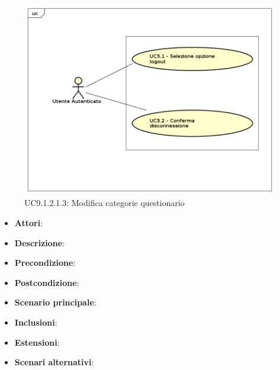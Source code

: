 					\label{UC9.1.2.1.3}
					\begin{figure}[h]
						\centering
					\includegraphics[scale=0.7,keepaspectratio]{UML/UC9.png}
						\caption{UC9.1.2.1.3: Modifica categorie questionario}
					\end{figure}
					\FloatBarrier
					\begin{itemize}
						\item \textbf{Attori}: 
						\item \textbf{Descrizione}: 
						\item \textbf{Precondizione}: 
						\item \textbf{Postcondizione}: 
						\item \textbf{Scenario principale}:
						\item \textbf{Inclusioni}:
						\item \textbf{Estensioni}:
						\item \textbf{Scenari alternativi}:
					\end{itemize}
					
